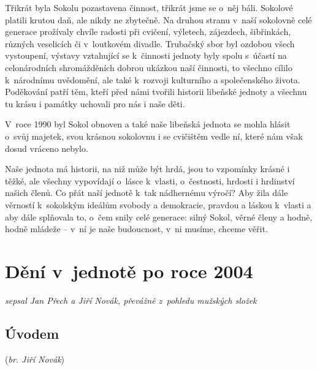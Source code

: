\documentclass[a5paper, 11pt, twoside]{article}
\begin{document}
Třikrát byla Sokolu pozastavena činnost, třikrát jsme se o~něj báli.
Sokolové platili krutou daň, ale nikdy ne zbytečně. Na druhou stranu
v~naší sokolovně celé generace prožívaly chvíle radosti při cvičení,
výletech, zájezdech, šibřinkách, různých veselicích či v~loutkovém
divadle. Trubačský sbor byl ozdobou všech vystoupení, výstavy vztahující
se k~činnosti jednoty byly spolu s~účastí na celonárodních shromážděních
dobrou ukázkou naší činnosti, to všechno cílilo k~národnímu uvědomění,
ale také k~rozvoji kulturního a společenského života. Poděkování patří
těm, kteří před námi tvořili historii libeňské jednoty a všechnu tu
krásu i památky uchovali pro nás i naše děti.

V~roce 1990 byl Sokol obnoven a také naše libeňská jednota se mohla
hlásit o~svůj majetek, svou krásnou sokolovnu i se cvičištěm vedle ní,
které nám však dosud vráceno nebylo.

Naše jednota má historii, na niž může být hrdá, jsou to vzpomínky krásné
i těžké, ale všechny vypovídají o~lásce k~vlasti, o~čestnosti, hrdosti i
hrdinství našich členů. Co přát naší jednotě k~tak nádhernému výročí?
Aby žila dále věrností k~sokolským ideálům svobody a demokracie, pravdou
a láskou k~vlasti a aby dále splňovala to, o~čem snily celé generace:
silný Sokol, věrné členy a hodně, hodně mládeže --⁠⁠⁠⁠⁠⁠ v~ní je naše
budoucnost, v~ni musíme, chceme věřit.

\section{Dění v~jednotě po roce
2004}

\textit{sepsal Jan Přech a Jiří Novák, převážně z~pohledu mužských složek}

\subsection{Úvodem}

(\textit{br. Jiří Novák})
\end{document}
